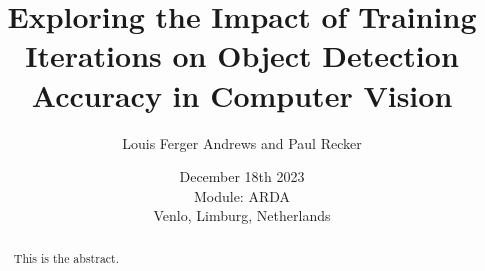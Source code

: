 \documentclass[]{report}
\title{Exploring the Impact of Training Iterations on Object Detection Accuracy in Computer Vision}
\author{Louis Ferger Andrews and Paul Recker}
\date{December 18th 2023 \\Module: ARDA \\Venlo, Limburg, Netherlands}
\begin{document}
\maketitle

\begin{abstract}
This is the abstract.

\end{abstract}

\tableofcontents
\setcounter{page}{3}
\listoffigures %
\listoftables %
\pagebreak
{}	
	
 




\printbibliography[title=References]

\end{document}
